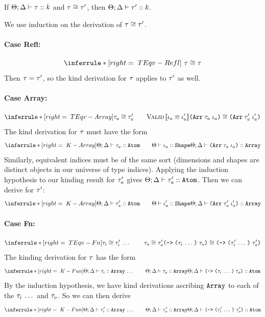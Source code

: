 \begin{lemma}
  \label{TEqvRespectsKinds}
  If $\Theta;\Delta \vdash \mathit{\tau} :: \mathit{k}$
  and $\mathit{\tau} \cong \mathit{\tau}'$,
  then $\Theta;\Delta \vdash \mathit{\tau}' :: \mathit{k}$.
\end{lemma}
\begin{sproof}
  We use induction on the derivation of
  $\mathit{\tau} \cong \mathit{\tau}'$.
  \paragraph{Case {\sc Refl}:}
  \[{\infr[TEqv-Refl]
    {\ }
    {\teqv{\type}{\type}}}\]
  Then $\mathit{\tau} = \mathit{\tau}'$,
  so the kind derivation for $\mathit{\tau}$ applies to $\mathit{\tau}'$ as well.
  \paragraph{Case {\sc Array}:}
  \[{\infr[TEqv-Array]
    {\teqv{\type_a}{\type_a'}
    \qquad
    \ieqv{\idx_a}{\idx_a'}}
    {\teqv
      {\typearray{\type_a}{\idx_a}}
      {\typearray{\type_a'}{\idx_a'}}}}\]
  The kind derivation for $\mathit{\tau}$ must have the form
  \[{\infr[K-Array]
    {\kindof{\sEnv}{\kEnv}{\type_a}{\kindatom}
      \qquad
      \sortof{\sEnv}{\idx_a}{\sortshp}}
    {\kindof{\sEnv}{\kEnv}{\typearray{\type_a}{\idx_a}}{\kindarray}}}\]
  Similarly, equivalent indices must be of the same sort
  (dimensions and shapes are distinct objects in our universe of type indices).
  Applying the induction hypothesis to our kinding result for $\mathit{\tau}_a'$
  gives $\Theta;\Delta \vdash \mathit{\tau}_a' :: \text{\tt Atom}$.
  Then we can derive for $\mathit{\tau}'$:
  \[{\infr[K-Array]
    {\kindof{\sEnv}{\kEnv}{\type_a'}{\kindatom}
      \qquad
      \sortof{\sEnv}{\idx_a'}{\sortshp}}
    {\kindof{\sEnv}{\kEnv}{\typearray{\type_a'}{\idx_a'}}{\kindarray}}}\]
  \paragraph{Case {\sc Fn}:}
  \[{\infr[TEqv-Fn]
    {\sequence{\teqv{\type_i}{\type_i'}}
      \qquad
      \teqv{\type_o}{\type_o'}}
    {\teqv
      {\typefun{\sequence{\type_i}}{\type_o}}
      {\typefun{\sequence{\type_i'}}{\type_o'}}}}\]
  The kinding derivation for $\mathit{\tau}$ has the form
  \[{\infr[K-Fun]
    {\sequence{\kindof{\sEnv}{\kEnv}{\type_i}{\kindarray}}
      \qquad
      \kindof{\sEnv}{\kEnv}{\type_o}{\kindarray}}
    {\kindof{\sEnv}{\kEnv}{\typefun{\sequence{\type_i}}{\type_o}}{\kindatom}}}\]
  By the induction hypothesis,
  we have kind derivations ascribing $\text{\tt Array}$
  to each of the $\mathit{\tau}_i \, \ldots \,$ and $\mathit{\tau}_o$.
  So we can then derive
  \[{\infr[K-Fun]
    {\sequence{\kindof{\sEnv}{\kEnv}{\type_i'}{\kindarray}}
      \qquad
      \kindof{\sEnv}{\kEnv}{\type_o'}{\kindarray}}
    {\kindof{\sEnv}{\kEnv}{\typefun{\sequence{\type_i'}}{\type_o'}}{\kindatom}}}\]

\end{sproof}
